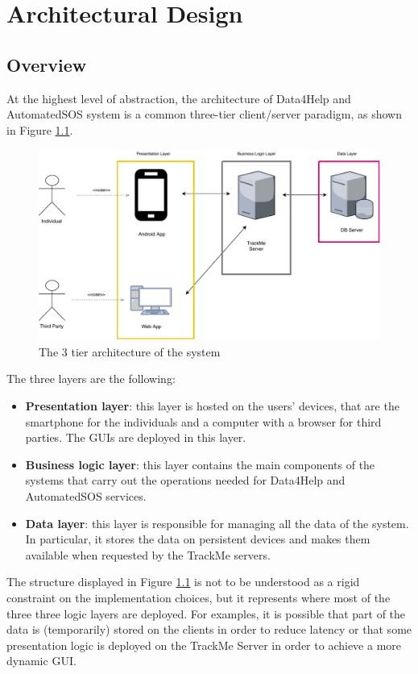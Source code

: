 \chapter{Architectural Design}

\section{Overview}

At the highest level of abstraction, the architecture of Data4Help and AutomatedSOS system is a common three-tier client/server paradigm, as shown in Figure \ref{f:3tier}.





\begin{figure}[H]
\centering
\includegraphics[scale=0.65]{resources/overview}
\caption{The 3 tier architecture of the system}\label{f:3tier}
\end{figure}
\noindent
The three layers are the following:

\begin{itemize}
\item \textbf{Presentation layer}: this layer is hosted on the users' devices, that are the smartphone for the individuals and a computer with a browser for third parties.
The GUIs are deployed in this layer.
\item \textbf{Business logic layer}: this layer contains the main components of the systems that carry out the operations needed for Data4Help and AutomatedSOS services.
\item \textbf{Data layer}: this layer is responsible for managing all the data of the system. 
In particular, it stores the data on persistent devices and makes them available when requested by the TrackMe servers.
\end{itemize}
The structure displayed in Figure \ref{f:3tier} is not to be understood as a rigid constraint on the implementation choices, but it represents where most of the three three logic layers are deployed.
For examples, it is possible that part of the data is (temporarily) stored on the clients in order to reduce latency or that some presentation logic is deployed on the TrackMe Server in order to achieve a more dynamic GUI.






